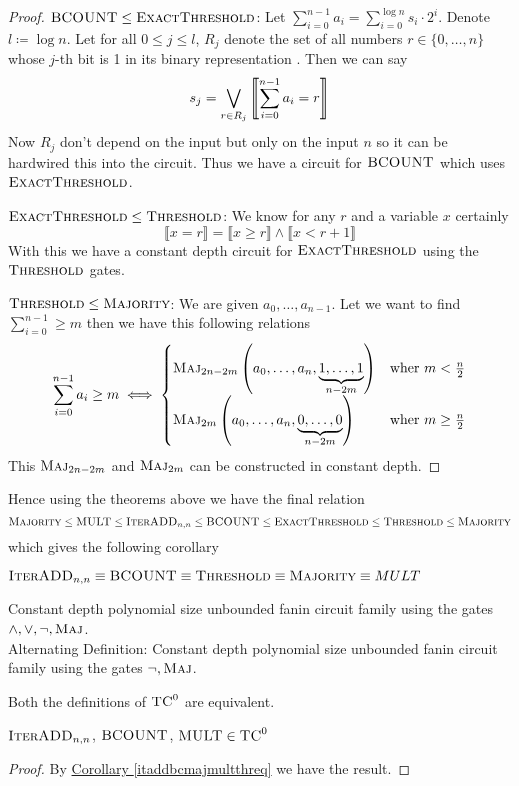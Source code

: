 \begin{proof}
	{$\textsc{BCOUNT}\leq \textsc{ExactThreshold}$}: Let $\sum\limits_{i=0}^{n-1}a_i=\sum\limits_{i=0}^{\log n}s_i\cdot 2^i$. Denote $l\coloneqq \log n$. Let for all $0\leq j\leq l$, $R_j$ denote the set of all numbers $r\in \{0,\dots,n\}$ whose $j$-th bit is 1 in its binary representation . Then we can say $$s_j=\bigvee_{r\in R_j}\left\llbracket \sum\limits_{i=0}^{n-1}a_i=r\right\rrbracket$$Now $R_j$ don't depend on the input but only on the input $n$ so it can be hardwired this into the circuit. Thus we have a circuit for $\textsc{BCOUNT}$ which uses $\textsc{ExactThreshold}$.
	
	{$\textsc{ExactThreshold}\leq \textsc{Threshold}$}: We know for any $r$ and a variable $x$ certainly $$\llbracket x=r\rrbracket= \llbracket x\geq r\rrbracket \wedge  \llbracket x< r+1\rrbracket$$With this we have a constant depth circuit for $\textsc{ExactThreshold}$ using the $\textsc{Threshold}$ gates.
	
	{$\textsc{Threshold}\leq \textsc{Majority}$}: We are given $a_0,\dots,a_{n-1}$. Let we want to find $\sum\limits_{i=0}^{n-1}\geq m$ then we have this following relations $$\sum\limits_{i=0}^{n-1}a_i\geq m\iff \begin{cases}
		\textsc{Maj}_{2n-2m}\left(a_0,\dots, a_n,\underbrace{1,\dots,1}_{n-2m}\right) & \text{wher $m<\frac{n}{2}$}\\
		\textsc{Maj}_{2m}\left(a_0,\dots, a_n,\underbrace{0,\dots,0}_{n-2m}\right) & \text{wher $m\geq\frac{n}{2}$}
	\end{cases}$$
	This $\textsc{Maj}_{2n-2m}$ and $\textsc{Maj}_{2m}$ can be constructed in constant depth.
\end{proof}

\begin{remark}
	Hence using the theorems above we have the final relation $$\textsc{Majority}\leq \textsc{MULT}\leq \textsc{IterADD}_{n,n}\leq \textsc{BCOUNT}\leq \textsc{ExactThreshold}\leq \textsc{Threshold}\leq \textsc{Majority}$$ which gives the following corollary
\end{remark}

\begin{corollary}\label{itaddbcmajmultthreq}
	$\textsc{IterADD}_{n,n}\equiv \textsc{BCOUNT}\equiv \textsc{Threshold} \equiv \textsc{Majority} \equiv MULT$
\end{corollary}


\begin{definition}[$\textsc{TC}^0$]
	Constant depth polynomial size unbounded fanin circuit family using the gates $\wedge, \vee, \neg,\textsc{Maj}$.\\
	Alternating Definition: Constant depth polynomial size unbounded fanin circuit family using the gates $ \neg,\textsc{Maj}$.
\end{definition}
\begin{theorem}
	Both the definitions of $\textsc{TC}^0$ are equivalent.
\end{theorem}

\begin{theorem}
	$\textsc{IterADD}_{n,n}$, $\textsc{BCOUNT}$, $\textsc{MULT}\in \textsc{TC}^0$
\end{theorem}
\begin{proof}
	By \hyperref[itaddbcmajmultthreq]{Corollary \ref{itaddbcmajmultthreq}} we have the result.
\end{proof}
